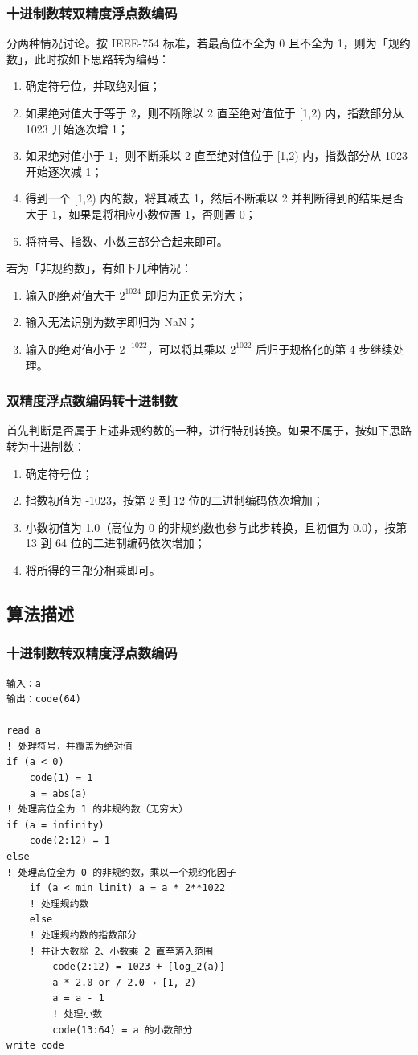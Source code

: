 \documentclass{ctexart}
\begin{document}
\subsubsection{十进制数转双精度浮点数编码}
分两种情况讨论。按 IEEE-754 标准，若最高位不全为 0 且不全为 1，则为「规约数」，此时按如下思路转为编码：
\begin{enumerate}
    \item 确定符号位，并取绝对值；
    \item 如果绝对值大于等于 2，则不断除以 2 直至绝对值位于 [1,2) 内，指数部分从 1023 开始逐次增 1；
    \item 如果绝对值小于 1，则不断乘以 2 直至绝对值位于 [1,2) 内，指数部分从 1023 开始逐次减 1；
    \item 得到一个 [1,2) 内的数，将其减去 1，然后不断乘以 2 并判断得到的结果是否大于 1，如果是将相应小数位置 1，否则置 0；
    \item 将符号、指数、小数三部分合起来即可。
\end{enumerate}
若为「非规约数」，有如下几种情况：
\begin{enumerate}
    \item 输入的绝对值大于 $2^{1024}$ 即归为正负无穷大；
    \item 输入无法识别为数字即归为 NaN；
    \item 输入的绝对值小于 $2^{-1022}$，可以将其乘以 $2^{1022}$ 后归于规格化的第 4 步继续处理。
\end{enumerate}
\subsubsection{双精度浮点数编码转十进制数}
首先判断是否属于上述非规约数的一种，进行特别转换。如果不属于，按如下思路转为十进制数：
\begin{enumerate}
    \item 确定符号位；
    \item 指数初值为 -1023，按第 2 到 12 位的二进制编码依次增加；
    \item 小数初值为 1.0（高位为 0 的非规约数也参与此步转换，且初值为 0.0），按第 13 到 64 位的二进制编码依次增加；
    \item 将所得的三部分相乘即可。
\end{enumerate}
\subsection{算法描述}
\subsubsection{十进制数转双精度浮点数编码}
\begin{lstlisting}
输入：a
输出：code(64)

read a
! 处理符号，并覆盖为绝对值
if (a < 0)
    code(1) = 1
    a = abs(a)
! 处理高位全为 1 的非规约数（无穷大）
if (a = infinity)
    code(2:12) = 1
else
! 处理高位全为 0 的非规约数，乘以一个规约化因子
    if (a < min_limit) a = a * 2**1022
    ! 处理规约数
    else
    ! 处理规约数的指数部分
    ! 并让大数除 2、小数乘 2 直至落入范围
        code(2:12) = 1023 + [log_2(a)]
        a * 2.0 or / 2.0 → [1, 2)
        a = a - 1
        ! 处理小数
        code(13:64) = a 的小数部分
write code
\end{lstlisting}
\end{document}

